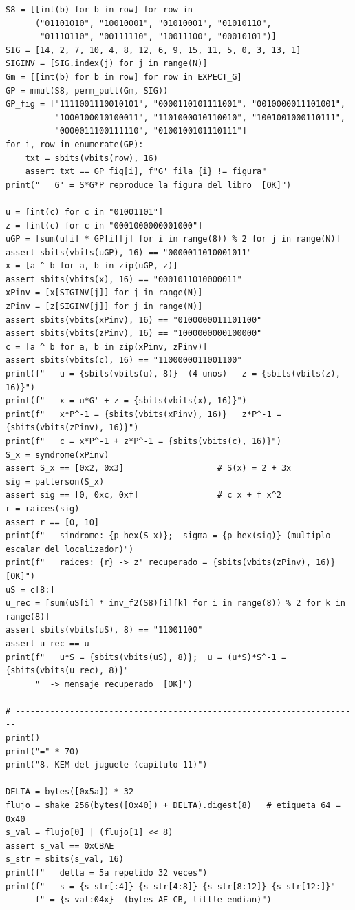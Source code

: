 \documentclass[11pt,a4paper,oneside]{report}
\begin{document}
\begin{lstlisting}
S8 = [[int(b) for b in row] for row in
      ("01101010", "10010001", "01010001", "01010110",
       "01110110", "00111110", "10011100", "00010101")]
SIG = [14, 2, 7, 10, 4, 8, 12, 6, 9, 15, 11, 5, 0, 3, 13, 1]
SIGINV = [SIG.index(j) for j in range(N)]
Gm = [[int(b) for b in row] for row in EXPECT_G]
GP = mmul(S8, perm_pull(Gm, SIG))
GP_fig = ["1111001110010101", "0000110101111001", "0010000011101001",
          "1000100010100011", "1101000010110010", "1001001000110111",
          "0000011100111110", "0100100101110111"]
for i, row in enumerate(GP):
    txt = sbits(vbits(row), 16)
    assert txt == GP_fig[i], f"G' fila {i} != figura"
print("   G' = S*G*P reproduce la figura del libro  [OK]")

u = [int(c) for c in "01001101"]
z = [int(c) for c in "0001000000001000"]
uGP = [sum(u[i] * GP[i][j] for i in range(8)) % 2 for j in range(N)]
assert sbits(vbits(uGP), 16) == "0000011010001011"
x = [a ^ b for a, b in zip(uGP, z)]
assert sbits(vbits(x), 16) == "0001011010000011"
xPinv = [x[SIGINV[j]] for j in range(N)]
zPinv = [z[SIGINV[j]] for j in range(N)]
assert sbits(vbits(xPinv), 16) == "0100000011101100"
assert sbits(vbits(zPinv), 16) == "1000000000100000"
c = [a ^ b for a, b in zip(xPinv, zPinv)]
assert sbits(vbits(c), 16) == "1100000011001100"
print(f"   u = {sbits(vbits(u), 8)}  (4 unos)   z = {sbits(vbits(z), 16)}")
print(f"   x = u*G' + z = {sbits(vbits(x), 16)}")
print(f"   x*P^-1 = {sbits(vbits(xPinv), 16)}   z*P^-1 = {sbits(vbits(zPinv), 16)}")
print(f"   c = x*P^-1 + z*P^-1 = {sbits(vbits(c), 16)}")
S_x = syndrome(xPinv)
assert S_x == [0x2, 0x3]                   # S(x) = 2 + 3x
sig = patterson(S_x)
assert sig == [0, 0xc, 0xf]                # c x + f x^2
r = raices(sig)
assert r == [0, 10]
print(f"   sindrome: {p_hex(S_x)};  sigma = {p_hex(sig)} (multiplo escalar del localizador)")
print(f"   raices: {r} -> z' recuperado = {sbits(vbits(zPinv), 16)}  [OK]")
uS = c[8:]
u_rec = [sum(uS[i] * inv_f2(S8)[i][k] for i in range(8)) % 2 for k in range(8)]
assert sbits(vbits(uS), 8) == "11001100"
assert u_rec == u
print(f"   u*S = {sbits(vbits(uS), 8)};  u = (u*S)*S^-1 = {sbits(vbits(u_rec), 8)}"
      "  -> mensaje recuperado  [OK]")

# ----------------------------------------------------------------------
print()
print("=" * 70)
print("8. KEM del juguete (capitulo 11)")

DELTA = bytes([0x5a]) * 32
flujo = shake_256(bytes([0x40]) + DELTA).digest(8)   # etiqueta 64 = 0x40
s_val = flujo[0] | (flujo[1] << 8)
assert s_val == 0xCBAE
s_str = sbits(s_val, 16)
print(f"   delta = 5a repetido 32 veces")
print(f"   s = {s_str[:4]} {s_str[4:8]} {s_str[8:12]} {s_str[12:]}"
      f" = {s_val:04x}  (bytes AE CB, little-endian)")


\end{lstlisting}
\end{document}
